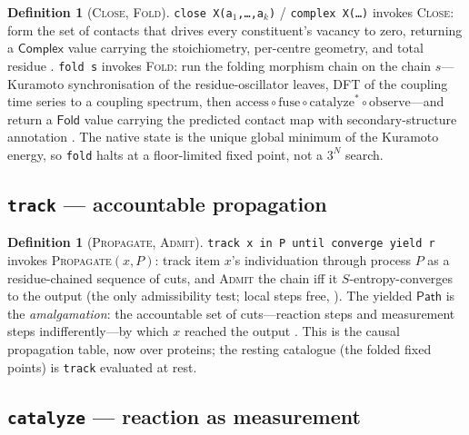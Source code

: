 \documentclass[11pt,a4paper]{article}
\theoremstyle{thmstyle}
\theoremstyle{definition}
\newtheorem{definition}[theorem]{Definition}
\theoremstyle{remark}
\newcommand{\shk}[1]{\texttt{#1}}
\begin{document}
\begin{definition}[\textsc{Close}, \textsc{Fold}]
\label{def:fold}
\shk{close\ X(a$_1$,\ldots,a$_k$)} / \shk{complex\ X(\ldots)} invokes
\textsc{Close}: form the set of contacts that drives every constituent's
vacancy to zero, returning a $\mathsf{Complex}$ value carrying the
stoichiometry, per-centre geometry, and total residue
\citep{sachikonye2025chem}. \shk{fold\ s} invokes \textsc{Fold}: run the
folding morphism chain on the chain $s$---Kuramoto synchronisation of the
residue-oscillator leaves, DFT of the coupling time series to a coupling
spectrum, then
$\mathrm{access}\circ\mathrm{fuse}\circ\mathrm{catalyze}^{*}\circ
\mathrm{observe}$---and return a $\mathsf{Fold}$ value carrying the
predicted contact map with secondary-structure annotation
\citep{sachikonye2025fold}. The native state is the unique global minimum
of the Kuramoto energy, so \shk{fold} halts at a floor-limited fixed point,
not a $3^N$ search.
\end{definition}

\subsection{\texorpdfstring{\shk{track} --- accountable propagation}{Track}}
\label{sec:stdlib-track}

\begin{definition}[\textsc{Propagate}, \textsc{Admit}]
\label{def:propagate}
\shk{track\ x\ in\ P\ until\ converge\ yield\ r} invokes
\textsc{Propagate}$(x,P)$: track item $x$'s individuation through process
$P$ as a residue-chained sequence of cuts, and \textsc{Admit} the chain iff
it $S$-entropy-converges to the output (the only admissibility test; local
steps free, ). The yielded $\mathsf{Path}$ is the
\emph{amalgamation}: the accountable set of cuts---reaction steps and
measurement steps indifferently---by which $x$ reached the output
\citep{sachikonye2025causal}. This is the causal propagation table, now
over proteins; the resting catalogue (the folded fixed points) is
\shk{track} evaluated at rest.
\end{definition}

\subsection{\texorpdfstring{\shk{catalyze} --- reaction as measurement}{Catalyze}}
\label{sec:stdlib-catalyze}
\end{document}
